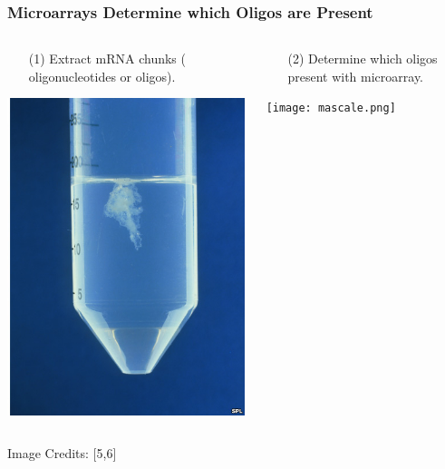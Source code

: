 \documentclass{beamer}
\begin{document}
\begin{frame}
  \frametitle{Microarrays Determine which Oligos are Present}
  \begin{columns}
    \begin{column}{0.48\textwidth}
      \begin{enumerate}
      \item[(1)] Extract mRNA chunks ({\color{blue} oligonucleotides} or {\color{blue}oligos}).
      \end{enumerate}
      \begin{center}
        \includegraphics[scale=.2]{extracteddna.jpg}
      \end{center}
    \end{column}
    \begin{column}{0.48\textwidth}
      \begin{enumerate}
        \item[(2)] Determine which oligos present with microarray. 
      \end{enumerate}
      \begin{center}
        \texttt{[image: mascale.png]}
      \end{center}
    \end{column}
  \end{columns}

  {\tiny Image Credits: [5,6]}
  
\end{frame}
\end{document}

